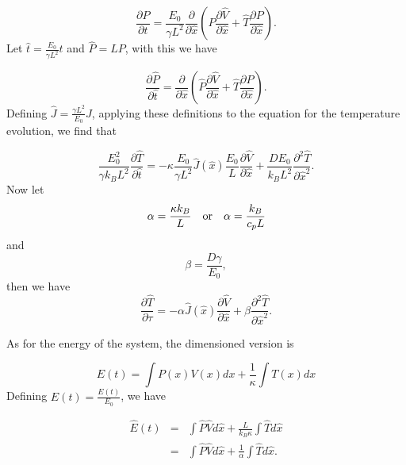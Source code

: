 \begin{equation}
\frac{\partial P}{\partial t} = \frac{E_0}{\gamma L^2} \frac{\partial}{\partial \hat{x}} \left (P \frac{\partial \hat{V}}{\partial \hat{x}} + \hat{T} \frac{\partial P}{\partial \hat{x}} \right ).
\end{equation}
Let $\hat{t} = \frac{E_0}{\gamma L^2} t$ and $\hat{P} = L P $, with this we have

\begin{equation}
\frac{\partial \hat{P}}{\partial \hat{t}} = \frac{\partial}{\partial \hat{x}} \left (\hat{P} \frac{\partial \hat{V}}{\partial \hat{x}} + \hat{T}  \frac{\partial \hat{P}}{\partial \hat{x}} \right ). \label{eqn:dimensionlessSmoluchowski}
\end{equation}
Defining $\hat{J} = \frac{\gamma L^2}{E_0} J $, applying these definitions to the equation for the temperature evolution, we find that

\begin{equation}
\frac{E_0^2}{\gamma k_B L^2} \frac{\partial \hat{T}}{\partial \hat{t}} = -\kappa \frac{E_0}{\gamma L^2}\hat{J}(\hat{x}) \frac{E_0}{L} \frac{\partial \hat{V}}{\partial \hat{x}} + \frac{D E_0}{k_B L^2} \frac{\partial^2 \hat{T}}{\partial \hat{x}^2}.
\end{equation}
Now let 
\begin{equation}
\alpha = \frac{\kappa k_B}{L} \quad \text{or} \quad \alpha = \frac{k_B}{c_p L} \\
\end{equation}
and
\begin{equation}
\beta = \frac{D \gamma}{E_0},
\end{equation}
then we have
\begin{equation}
\frac{\partial \hat{T}}{\partial \tau} = -\alpha \hat{J}(\hat{x}) \frac{\partial \hat{V}}{\partial \hat{x}} + \beta \frac{\partial^2 \hat{T}}{\partial \hat{x}^2}. \label{eqn:dimensionlessHeat}
\end{equation}

As for the energy of the system, the dimensioned version is

\begin{equation}
E(t) = \int P(x) V(x) dx + \frac{1}{\kappa} \int T(x) dx
\end{equation}
Defining $\hat{E}(t) = \frac{E(t)}{E_0}$, we have

\begin{eqnarray}
\hat{E}(t) & = & \int \hat{P} \hat{V} d \hat{x} + \frac{L}{k_B \kappa} \int \hat{T} d\hat{x} \\
              & = & \int \hat{P} \hat{V} d \hat{x} + \frac{1}{\alpha} \int \hat{T} d\hat{x}.
\end{eqnarray}


